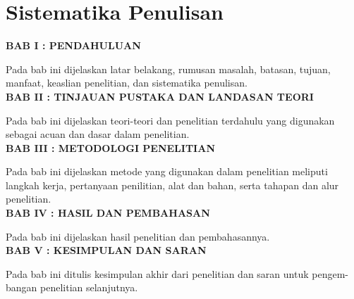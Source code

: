 \section{Sistematika Penulisan}
\noindent
\textbf{BAB I : PENDAHULUAN}

Pada bab ini dijelaskan latar belakang, rumusan masalah, batasan, tujuan,
manfaat, keaslian penelitian, dan sistematika penulisan.\\


\noindent
\textbf{BAB II : TINJAUAN PUSTAKA DAN LANDASAN TEORI}

Pada bab ini dijelaskan teori-teori dan penelitian terdahulu yang digunakan
sebagai acuan dan dasar dalam penelitian.\\

\noindent
\textbf{BAB III : METODOLOGI PENELITIAN}

Pada bab ini dijelaskan metode yang digunakan dalam penelitian meliputi
langkah kerja, pertanyaan penilitian, alat dan bahan, serta tahapan dan alur penelitian.\\

\noindent
\textbf{BAB IV : HASIL DAN PEMBAHASAN}

Pada bab ini dijelaskan hasil penelitian dan pembahasannya.\\

\noindent
\textbf{BAB V : KESIMPULAN DAN SARAN}

Pada bab ini ditulis kesimpulan akhir dari penelitian dan saran untuk pengem-
bangan penelitian selanjutnya.\\


\begin{comment}

\end{comment}
